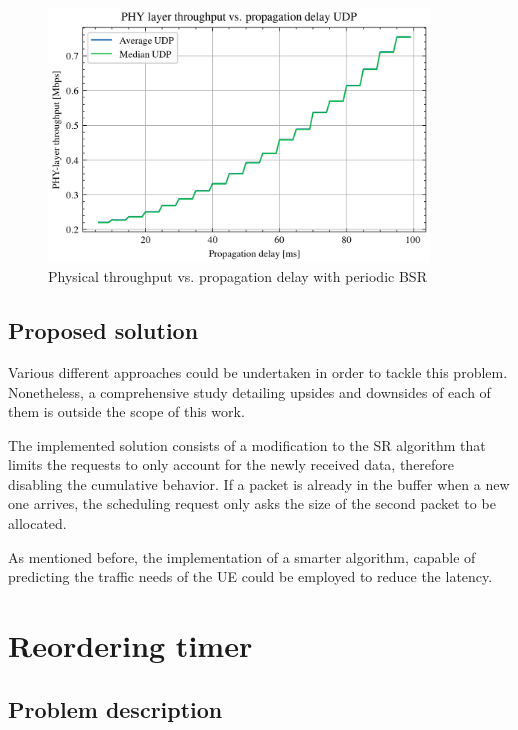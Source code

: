 \begin{figure}[ht]
    \centering
    \includegraphics[width=0.9\textwidth]{res/phy-thr-udp-runaway.png}
    \caption{Physical throughput vs. propagation delay with periodic \ac{BSR}}
    \label{fig:phy-thr-runaway}
\end{figure}

\subsection{Proposed solution}

Various different approaches could be undertaken in order to tackle this problem. Nonetheless, a comprehensive study detailing upsides and downsides of each of them is outside the scope of this work. 

The implemented solution consists of a modification to the \ac{SR} algorithm that limits the requests to only account for the newly received data, therefore disabling the cumulative behavior. If a packet is already in the buffer when a new one arrives, the scheduling request only asks the size of the second packet to be allocated.

As mentioned before, the implementation of a smarter algorithm, capable of predicting the traffic needs of the \ac{UE} could be employed to reduce the latency. 

\section{Reordering timer}
\label{sec:reord-timer}

\subsection{Problem description}
